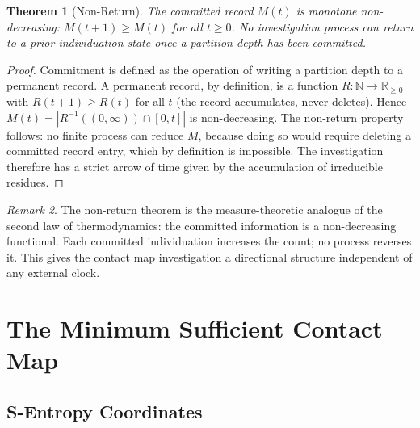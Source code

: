 \documentclass[12pt,a4paper,twocolumn]{article}
\theoremstyle{plain}
\newtheorem{theorem}{Theorem}[section]
\theoremstyle{definition}
\theoremstyle{remark}
\newtheorem{remark}[theorem]{Remark}
\newcommand{\Real}{\mathbb{R}}
\newcommand{\Nat}{\mathbb{N}}
\begin{document}
\begin{theorem}[Non-Return]
\label{thm:non-return}
The committed record $M(t)$ is monotone non-decreasing: $M(t+1) \geq M(t)$
for all $t \geq 0$.  No investigation process can return to a prior
individuation state once a partition depth has been committed.
\end{theorem}

\begin{proof}
Commitment is defined as the operation of writing a partition depth to a
permanent record.  A permanent record, by definition, is a function
$R : \Nat \to \Real_{\geq 0}$ with $R(t+1) \geq R(t)$ for all $t$ (the
record accumulates, never deletes).  Hence $M(t) = |R^{-1}((0,\infty)) \cap
[0,t]|$ is non-decreasing.  The non-return property follows: no finite
process can reduce $M$, because doing so would require deleting a committed
record entry, which by definition is impossible.  The investigation therefore
has a strict arrow of time given by the accumulation of irreducible residues.
\end{proof}

\begin{remark}
The non-return theorem is the measure-theoretic analogue of the
second law of thermodynamics: the committed information is a non-decreasing
functional.  Each committed individuation increases the count; no process
reverses it.  This gives the contact map investigation a directional
structure independent of any external clock.
\end{remark}

\section{The Minimum Sufficient Contact Map}
\label{sec:mscm}

\subsection{S-Entropy Coordinates}
\end{document}
